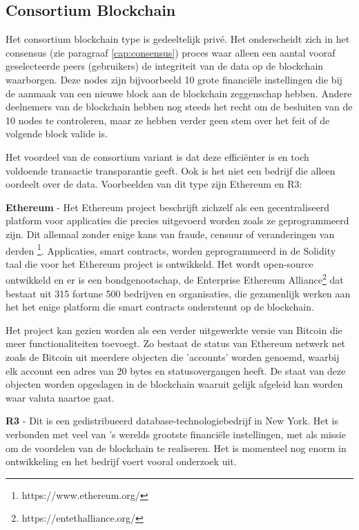 \subsection{Consortium Blockchain}
Het consortium blockchain type is gedeeltelijk privé. Het onderscheidt zich in het consensus (zie paragraaf \ref{cap:consensus}) proces waar alleen een aantal vooraf geselecteerde peers (gebruikers) de integriteit van de data op de blockchain waarborgen. Deze nodes zijn bijvoorbeeld 10 grote financiële instellingen die bij de aanmaak van een nieuwe block aan de blockchain zeggenschap hebben. Andere deelnemers van de blockchain hebben nog steeds het recht om de besluiten van de 10 nodes te controleren, maar ze hebben verder geen stem over het feit of de volgende block valide is.\par
\newpage					
Het voordeel van de consortium variant is dat deze efficiënter is en toch voldoende transactie transparantie geeft. Ook is het niet een bedrijf die alleen oordeelt over de data. Voorbeelden van dit type zijn Ethereum en R3:

\textbf{Ethereum} - Het Ethereum project beschrijft zichzelf als een gecentraliseerd platform voor applicaties die precies uitgevoerd worden zoals ze geprogrammeerd zijn. Dit allemaal zonder enige kans van fraude, censuur of veranderingen van derden \footnote{https://www.ethereum.org/}. Applicaties, smart contracts, worden geprogrammeerd in de Solidity taal die voor het Ethereum project is ontwikkeld. Het wordt open-source ontwikkeld en er is een bondgenootschap, de Enterprise Ethereum Alliance\footnote{https://entethalliance.org/} dat bestaat uit 315 fortune 500 bedrijven en organisaties, die gezamenlijk werken aan het het enige platform die smart contracts ondersteunt op de blockchain.\cite{ethWood}\par

Het project kan gezien worden als een verder uitgewerkte versie van Bitcoin die meer functionaliteiten toevoegt. Zo bestaat de status van Ethereum netwerk net zoals de Bitcoin uit meerdere objecten die 'accounts' worden genoemd, waarbij elk account een adres van 20 bytes en statusovergangen heeft. De staat van deze objecten worden opgeslagen in de blockchain waaruit gelijk afgeleid kan worden waar valuta naartoe gaat.\cite{whitePaperEthereum}

\textbf{R3} - Dit is een gedistribueerd database-technologiebedrijf in New York. Het is verbonden met veel van ’s werelds grootste financiële instellingen, met als missie om de voordelen van de blockchain te realiseren. Het is momenteel nog enorm in ontwikkeling en het bedrijf voert vooral onderzoek uit\cite{R3}.

